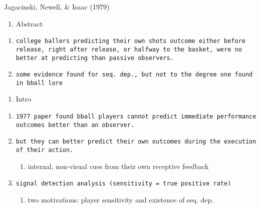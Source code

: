 \documentclass[12pt,twoside]{dukestatscithesis}
\providecommand{\tightlist}{%
  \setlength{\itemsep}{0pt}\setlength{\parskip}{0pt}}
\theoremstyle{definition}
\theoremstyle{definition}
\theoremstyle{definition}
\theoremstyle{remark}
\begin{document}
Jagacinski, Newell, \& Isaac (1979)
\begin{enumerate}
\def\labelenumi{\Alph{enumi}.}
\tightlist
\item
  Abstract
\end{enumerate}
\begin{enumerate}
\def\labelenumi{\arabic{enumi}.}
\item
\begin{verbatim}
college ballers predicting their own shots outcome either before release, right after release, or halfway to the basket, were no better at predicting than passive observers.
\end{verbatim}
\item
\begin{verbatim}
some evidence found for seq. dep., but not to the degree one found in bball lore
\end{verbatim}
\end{enumerate}
\begin{enumerate}
\def\labelenumi{\Alph{enumi}.}
\setcounter{enumi}{1}
\tightlist
\item
  Intro
\end{enumerate}
\begin{enumerate}
\def\labelenumi{\arabic{enumi}.}
\item
\begin{verbatim}
1977 paper found bball players cannot predict immediate performance outcomes better than an observer.
\end{verbatim}
\item
\begin{verbatim}
but they can better predict their own outcomes during the execution of their action.
\end{verbatim}
  \begin{enumerate}
  \def\labelenumii{\alph{enumii}.}
  \tightlist
  \item
    internal, non-visual cues from their own receptive feedback
  \end{enumerate}
\item
\begin{verbatim}
signal detection analysis (sensitivity = true positive rate)
\end{verbatim}
  \begin{enumerate}
  \def\labelenumii{\alph{enumii}.}
  \tightlist
  \item
    two motivations: player sensitivity and existence of seq. dep.
  \end{enumerate}
\end{enumerate}
\end{document}
